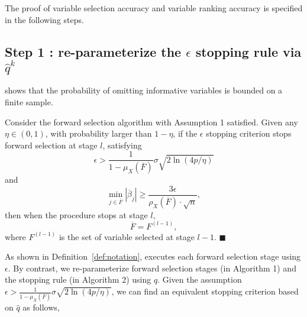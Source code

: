 \documentclass[11pt,review,authoryear]{elsarticle}
\begin{document}
\begin{appendices}
The proof of variable selection accuracy and variable ranking accuracy is specified in the following steps.


\subsection*{Step 1 : re-parameterize the $\epsilon$ stopping rule via $\widehat{q}^k$ }

\citet[Theorem 1]{zhang09} shows that the probability of omitting informative variables is bounded on a finite sample.
%
\begin{theorem}
  \label{theoremA1}
  \citep{zhang09} Consider the forward selection algorithm with Assumption 1 satisfied. Given any $\eta \in \left( 0, 1 \right)$, with probability larger than $1 - \eta$, if the $\epsilon$  stopping criterion stops forward selection at stage $l$, satisfying
  \begin{equation}
    \epsilon>\frac{1}{1-\mu_X \left( \overline{F} \right)} \sigma\sqrt{ 2 \ln \left( 4p / \eta \right)}
  \end{equation}
  and
  \begin{equation}
    \min_{j\in\overline{F}}\left|\overline{\beta}_{j}\right|\geqslant\frac{3\epsilon}{\rho_{X}\left(\overline{F}\right)\cdot\sqrt{n}}, \label{thm0}
  \end{equation}
  then when the procedure stops at stage $l$,
  \begin{equation}
    \overline{F}=F^{\left(l-1\right)}, \nonumber
  \end{equation}
  where $F^{\left(l-1\right)}$ is the set of variable selected at stage $l-1$. $\blacksquare$
\end{theorem}

As shown in Definition~\ref{def:notation}, \citet{zhang09} executes each forward selection stage using $\epsilon$. By contrast, we re-parameterize forward selection stages (in Algorithm 1) and the stopping rule (in Algorithm 2) using $\widehat{q}$. Given the assumption $\epsilon > \frac{1}{1-\mu_X \left( \overline{F} \right)} \sigma\sqrt{ 2 \ln \left( 4p / \eta \right)}$, we can find an equivalent stopping criterion based on $\widehat{q}$ as follows,


\end{appendices}
\end{document}
